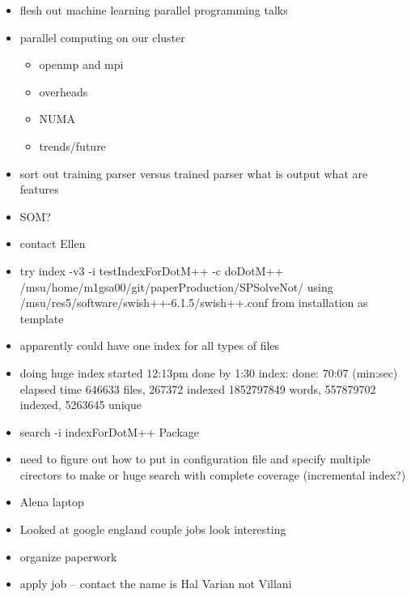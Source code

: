 \documentclass[hyperref]{labbook}
\begin{document}

\begin{itemize}
\item flesh out machine learning parallel programming talks
\item parallel computing on our cluster
  \begin{itemize}
  \item openmp and mpi
  \item overheads
  \item NUMA
  \item trends/future
  \end{itemize}
\end{itemize}

\begin{itemize}
\item sort out training parser versus trained parser  what is output  what are features
\item SOM?
\item contact Ellen
\end{itemize}

\begin{itemize}
\item try index   -v3 -i testIndexForDotM++ -c doDotM++  /msu/home/m1gsa00/git/paperProduction/SPSolveNot/ using /msu/res5/software/swish++-6.1.5/swish++.conf from installation as template 
\item apparently could have one index for all types of files
\item doing huge index started 12:13pm done by 1:30
index: done:
  70:07 (min:sec) elapsed time
  646633 files, 267372 indexed
  1852797849 words, 557879702 indexed, 5263645 unique

\item search   -i indexForDotM++ Package
\item need to figure out how to put in configuration file and specify multiple cirectors to make or huge search with complete coverage  (incremental index?)
\item Alena laptop
\end{itemize}

\begin{itemize}
\item Looked at google england couple jobs look interesting
\item organize paperwork
\item apply job  -- contact  the name is Hal Varian not Villani
\end{itemize}
\end{document}
